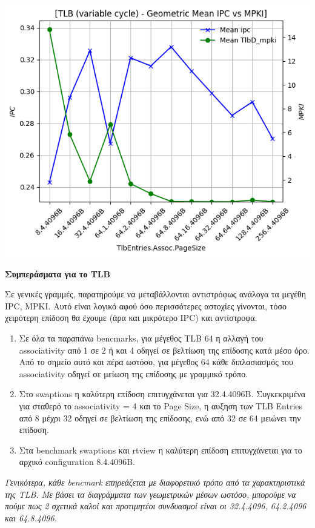 \begin{minipage}{\textwidth}
    \begin{center}
        \\
        \vspace{3mm}
        \includegraphics[scale=0.60]{graphs/TLB/var/mean.png}
        \vspace{6mm}
    \end{center}
\end{minipage}


\begin{center}
    \textbf{Συμπεράσματα για το \textlatin{TLB}}    
\end{center}

Σε γενικές γραμμές, παρατηρούμε να μεταβάλλονται αντιστρόφως ανάλογα τα μεγέθη
\textlatin{IPC, MPKI}. Αυτό είναι λογικό αφού όσο περισσότερες αστοχίες
γίνονται, τόσο χειρότερη επίδοση θα έχουμε (άρα και μικρότερο \textlatin{IPC})
και αντίστροφα. 
\begin{enumerate}
    \item Σε όλα τα παραπάνω bencmarks, για μέγεθος TLB 64 η αλλαγή του
    associativity από 1 σε 2 ή και 4 οδηγεί σε βελτίωση της επίδοσης κατά μέσο
    όρο. Από το σημείο αυτό και πέρα ωστόσο, για μέγεθος 64 κάθε διπλασιασμός
    του associativity οδηγεί σε μείωση της επίδοσης με γραμμικό τρόπο.

    \item Στο swaptions η καλύτερη επίδοση επιτυγχάνεται για 32.4.4096B. Συγκεκριμένα
    για σταθερό το associativity = 4 και το Page Size, η αυξηση των TLB Entries
    από 8 μέχρι 32 οδηγεί σε βελτίωση της επίδοσης, ενώ από 32 σε 64 μειώνει την
    επίδοση.
   
    \item Στα benchmark swaptions και rtview η καλύτερη επίδοση επιτυγχάνεται για το
    αρχικό configuration 8.4.4096B.

\end{enumerate}

\textit{Γενικότερα, κάθε bencmark επηρεάζεται με διαφορετικό τρόπο από τα χαρακτηριστικά
της TLB. Με βάσει τα διαγράμματα των γεωμετρικών μέσων ωστόσο, μπορούμε να πούμε
πως 2 σχετικά καλοί και προτιμητέοι συνδυασμοί είναι οι 32.4.4096, 64.2.4096 και
64.8.4096.}

\vspace{1cm}